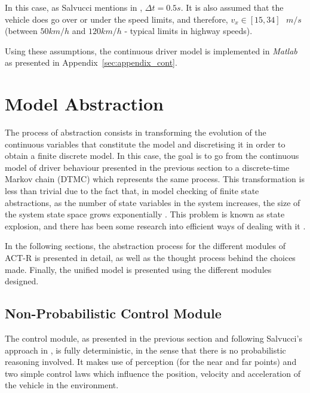 In this case, as Salvucci mentions in \cite{salvucci_1}, $\Delta t = 0.5s$. It is also assumed that the vehicle does go over or under the speed limits, and therefore, $v_x \in [15, 34]\text{ }m/s$ (between $50km/h$ and $120km/h$ - typical limits in highway speeds).

Using these assumptions, the continuous driver model is implemented in \textit{Matlab} as presented in Appendix~\ref{sec:appendix_cont}.

\section{Model Abstraction}

The process of abstraction consists in transforming the evolution of the continuous variables that constitute the model and discretising it in order to obtain a finite discrete model. In this case, the goal is to go from the continuous model of driver behaviour presented in the previous section to a discrete-time Markov chain (DTMC) which represents the same process. This transformation is less than trivial due to the fact that, in model checking of finite state abstractions, as the number of state variables in the system increases, the size of the system state space grows exponentially \cite{state_explosion}. This problem is known as state explosion, and there has been some research into efficient ways of dealing with it \cite{abstraction_1, abstraction_2}. 

In the following sections, the abstraction process for the different modules of ACT-R is presented in detail, as well as the thought process behind the choices made. Finally, the unified model is presented using the different modules designed.

\subsection{Non-Probabilistic Control Module}
\label{sec:non_prob_control}

The control module, as presented in the previous section and following Salvucci's approach in \cite{salvucci_1}, is fully deterministic, in the sense that there is no probabilistic reasoning involved. It makes use of perception (for the near and far points) and two simple control laws which influence the position, velocity and acceleration of the vehicle in the environment.

